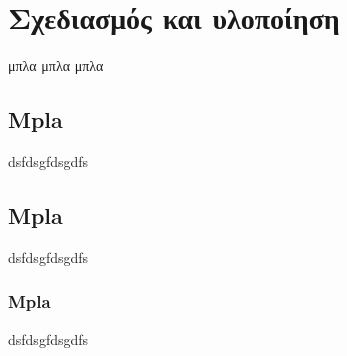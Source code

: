 \chapter{Σχεδιασμός και υλοποίηση}
\label{chap:implementation}
μπλα μπλα μπλα

\section{Mpla}
dsfdsgfdsgdfs

\section{Mpla}
dsfdsgfdsgdfs
\subsection{Mpla}
dsfdsgfdsgdfs



